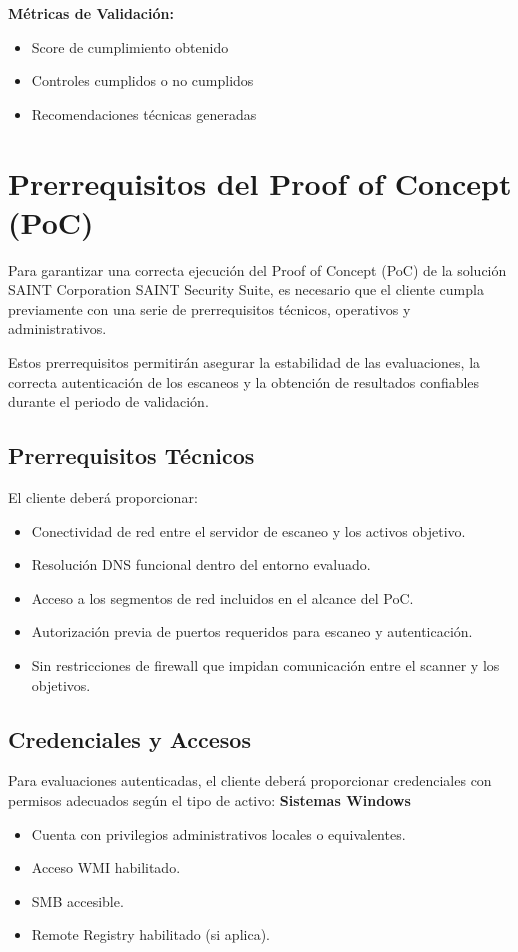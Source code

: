 \documentclass[a4paper]{article}
\begin{document}
    \textbf{Métricas de Validación:}
    \begin{itemize}
        \item Score de cumplimiento obtenido
        \item Controles cumplidos o no cumplidos
        \item Recomendaciones técnicas generadas
    \end{itemize}

    

    
    \section{Prerrequisitos del Proof of Concept (PoC)}
    Para garantizar una correcta ejecución del Proof of Concept (PoC) de la solución SAINT Corporation SAINT Security Suite, es necesario que el cliente cumpla previamente con una serie de prerrequisitos técnicos, operativos y administrativos.

    Estos prerrequisitos permitirán asegurar la estabilidad de las evaluaciones, la correcta autenticación de los escaneos y la obtención de resultados confiables durante el periodo de validación.

    \subsection{Prerrequisitos Técnicos}
    El cliente deberá proporcionar:
    \begin{itemize}
        \item Conectividad de red entre el servidor de escaneo y los activos objetivo.
        \item Resolución DNS funcional dentro del entorno evaluado.
        \item Acceso a los segmentos de red incluidos en el alcance del PoC.
        \item Autorización previa de puertos requeridos para escaneo y autenticación.
        \item Sin restricciones de firewall que impidan comunicación entre el scanner y los objetivos.
    \end{itemize}

    \subsection{Credenciales y Accesos}
    Para evaluaciones autenticadas, el cliente deberá proporcionar credenciales con permisos adecuados según el tipo de activo:
    \textbf{Sistemas Windows}
        \begin{itemize}
            \item Cuenta con privilegios administrativos locales o equivalentes.
            \item Acceso WMI habilitado.
            \item SMB accesible.
            \item Remote Registry habilitado (si aplica).
        \end{itemize}
\end{document}
